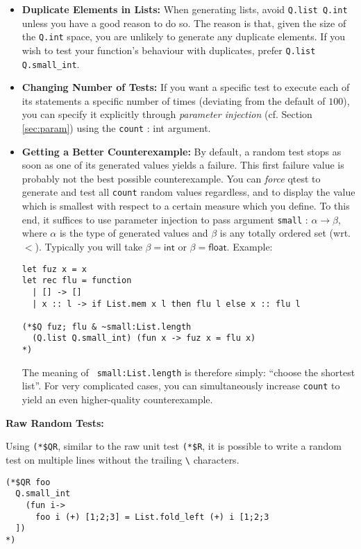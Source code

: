 \begin{itemize}
\item \textbf{Duplicate Elements in Lists:}
When generating lists, avoid \texttt{Q.list Q.int} unless you have a good reason to do so.
The reason is that, given the size of the \texttt{Q.int} space, you are unlikely
to generate any duplicate elements. If you wish to test your function's behaviour with
duplicates, prefer \texttt{Q.list Q.small\_int}.

\item \textbf{Changing Number of Tests:}
If you want a specific test to execute each of its statements a specific number of times
(deviating from the default of $100$), you can specify it explicitly through
\emph{parameter injection} (cf. Section \ref{sec:param}) using the
\texttt{count} : \textsf{int} argument.

\item \textbf{Getting a Better Counterexample:}
By default, a random test stops as soon as one of its generated values
yields a failure. This first failure value is probably not the best possible
counterexample. You can \emph{force} qtest to generate and test all \texttt{count}
random values regardless, and to display the value which is smallest with respect
to a certain measure which you define. To this end, it suffices to use parameter injection
to pass argument \texttt{small} : $\alpha \to \beta$,
where $\alpha$ is the type of
generated values and $\beta$ is any totally ordered set (wrt. $<$). Typically
you will take $\beta = \textsf{int}$ or $\beta = \textsf{float}$. Example:
\begin{verbatim}
let fuz x = x
let rec flu = function
  | [] -> []
  | x :: l -> if List.mem x l then flu l else x :: flu l

(*$Q fuz; flu & ~small:List.length
  (Q.list Q.small_int) (fun x -> fuz x = flu x)
*)
\end{verbatim}
The meaning of \texttt{~small:List.length} is therefore simply:
``choose the shortest list''. For very complicated cases, you can simultaneously
increase \texttt{count} to yield an even higher-quality counterexample.

\end{itemize}

\textbf{Raw Random Tests:}

Using \verb!(*$QR!, similar to the raw unit test \verb!(*$R!, it is possible
to write a random test on multiple lines without the trailing \verb!\! characters.

\begin{verbatim}
(*$QR foo
  Q.small_int
    (fun i->
      foo i (+) [1;2;3] = List.fold_left (+) i [1;2;3
  ])
*)
\end{verbatim}
